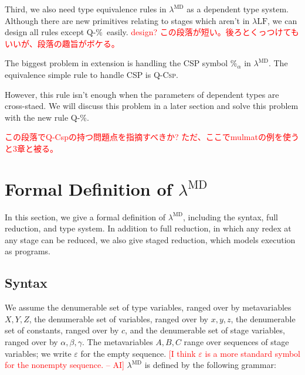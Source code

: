 \documentclass[runningheads]{llncs}
\newcommand{\red}[1]{\textcolor{red}{#1 }}
\newcommand{\LMD}{$\lambda^{\textrm{MD}}$\xspace}
\newcommand{\LLF}{$\lambda\textrm{LF}$\xspace}
\newcommand{\G}{\Gamma}
\newcommand{\V}{\vdash_\Sigma}
\newcommand{\E}{\equiv}
\newcommand{\QCsp}{\textsc{Q-Csp}}
\newcommand{\QPercent}{\textsc{Q-\%}}
\newcommand{\AI}[1]{\textcolor{red}{[#1 -- AI]}}
\begin{document}

Third, we also need type equivalence rules in \LMD as a dependent type system.
Although there are new primitives relating to stages which aren't in \LLF,
we can design all rules except \QPercent\ easily.
\red{design?}
\red{この段落が短い。後ろとくっつけてもいいが、段落の趣旨がボケる。}


The biggest problem in extension is handling the CSP symbol $\%_\alpha$ in \LMD.
The equivalence simple rule to handle CSP is \QCsp.
\begin{center}
    \infrule{\G\V M \E N : \tau @A}{\G\V\%_\alpha M \E \%_\alpha N : \tau @{A\alpha}}{\QCsp}
\end{center}
However, this rule isn't enough when the parameters of dependent types are cross-staed.
We will discuss this problem in a later section and solve this problem with the new rule \QPercent.
\begin{center}
    \infrule{\G\V M:\tau @{A\alpha} \andalso \G\V M:\tau @A}{\G\V\%_\alpha M \E M : \tau @{A\alpha}}{\QPercent}
\end{center}
\red{この段落でQ-Cspの持つ問題点を指摘すべきか? ただ、ここでmulmatの例を使うと3章と被る。}

\section{Formal Definition of \LMD}

In this section, we give a formal definition of \LMD, including
the syntax, full reduction, and type system.  In addition to full reduction,
in which any redex at any stage can be reduced, we also give staged reduction,
which models execution as programs.

\subsection{Syntax}

We assume the denumerable set of type variables, ranged over by
metavariables \(X, Y, Z\), the denumerable set of variables, ranged
over by \(x,y,z\), the denumerable set of constants, ranged over by
\(c\), and the denumerable set of stage variables, ranged over by
\(\alpha, \beta, \gamma\).  The metavariables \(A, B, C\) range over
sequences of stage variables; we write \(\varepsilon\) for the empty
sequence.  \AI{I think $\varepsilon$ is a more standard symbol for
  the nonempty sequence.}  \LMD is defined by the following grammar:
\end{document}
